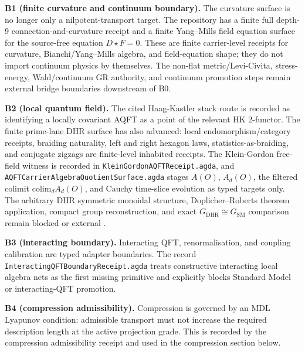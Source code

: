 \documentclass[11pt]{article}
\theoremstyle{definition}
\theoremstyle{plain}
\theoremstyle{remark}
\begin{document}
\textbf{B1 (finite curvature and continuum boundary).} The curvature surface
is no longer only a nilpotent-transport target. The repository has a finite
full depth-9 connection-and-curvature receipt and a finite Yang--Mills field
equation surface for the source-free equation \(D\star F=0\). These are
finite carrier-level receipts for curvature, Bianchi/Yang--Mills algebra, and
field-equation shape; they do not import continuum physics by themselves. The
non-flat metric/Levi-Civita, stress-energy, Wald/continuum GR authority, and
continuum promotion steps remain external bridge boundaries downstream of B0.

\textbf{B2 (local quantum field).} The cited Haag-Kastler stack route is
recorded as identifying a locally covariant AQFT as a point of the relevant HK
2-functor. The finite prime-lane DHR surface has also advanced: local
endomorphism/category receipts, braiding naturality, left and right hexagon
laws, statistics-as-braiding, and conjugate zigzags are finite-level inhabited
receipts. The Klein-Gordon free-field witness is recorded in
\texttt{KleinGordonAQFTReceipt.agda}, and
\texttt{AQFTCarrierAlgebraQuotientSurface.agda} stages \(A(O)\), \(A_d(O)\),
the filtered colimit \(\mathrm{colim}_d A_d(O)\), and Cauchy time-slice
evolution as typed targets only. The arbitrary DHR symmetric monoidal
structure, Doplicher--Roberts theorem application, compact group
reconstruction, and exact \(G_{\mathrm{DHR}}\cong G_{\mathrm{SM}}\) comparison
remain blocked or external \cite{haag-kastler-stacks-2024}.

\textbf{B3 (interacting boundary).} Interacting QFT, renormalisation, and
coupling calibration are typed adapter boundaries. The record
\texttt{InteractingQFTBoundaryReceipt.agda} treats constructive interacting
local algebra nets as the first missing primitive and explicitly blocks
Standard Model or interacting-QFT promotion.

\textbf{B4 (compression admissibility).} Compression is governed by an MDL
Lyapunov condition: admissible transport must not increase the required
description length at the active projection grade. This is recorded by the
compression admissibility receipt and used in the compression section below.
\end{document}
